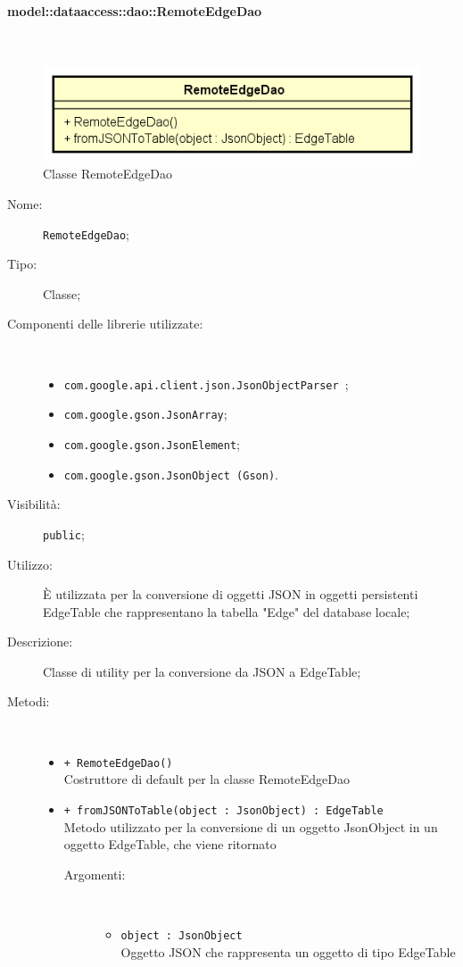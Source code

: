 \documentclass[../DefinizioneDiProdotto.tex]{subfiles}
\begin{document}
\paragraph{model::dataaccess::dao::RemoteEdgeDao}
\
\begin{figure}[H]
	\centering
	\includegraphics[width=\maxwidth]{img/RemoteEdgeDao.png}
	\caption{Classe RemoteEdgeDao}\label{fig:model::dataaccess::dao::RemoteEdgeDao} 
\end{figure}
\begin{description}
	\item[Nome:] \texttt{RemoteEdgeDao};
	\item[Tipo:] Classe;
	\item[Componenti delle librerie utilizzate:] \
	\begin{itemize}
		\item \texttt{com.google.api.client.json.JsonObjectParser
		};
		
		\item \texttt{com.google.gson.JsonArray};
		
		\item \texttt{com.google.gson.JsonElement};
		
		\item \texttt{com.google.gson.JsonObject (Gson)}.
		
	\end{itemize}
	\item[Visibilità:] \texttt{public};
	\item[Utilizzo:] È utilizzata per la conversione di oggetti JSON in oggetti persistenti EdgeTable che rappresentano la tabella "Edge" del database locale;
	\item[Descrizione:] Classe di utility per la conversione da JSON a EdgeTable;
	\item[Metodi:] \
	\begin{itemize}
		\item \texttt{+ RemoteEdgeDao()}\\
		Costruttore di default per la classe RemoteEdgeDao
		\item \texttt{+ fromJSONToTable(object : JsonObject) : EdgeTable}\\
		Metodo utilizzato per la conversione di un oggetto JsonObject in un oggetto EdgeTable, che viene ritornato
		\begin{description}
			\item[Argomenti:] \
			\begin{itemize}
				\item \texttt{object : JsonObject}\\
				Oggetto JSON che rappresenta un oggetto di tipo EdgeTable\end{itemize}
		\end{description}
	\end{itemize}
\end{description}
\end{document}
